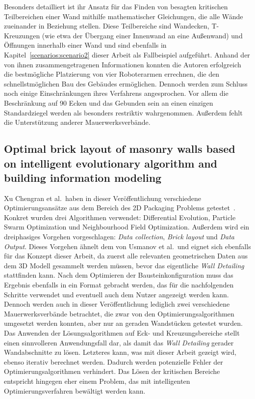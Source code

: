 Besonders detailliert ist ihr Ansatz für das Finden von besagten kritischen Teilbereichen einer Wand mithilfe mathematischer Gleichungen, die alle Wände zueinander in Beziehung stellen.
Diese Teilbereiche sind Wandecken, T-Kreuzungen (wie etwa der Übergang einer Innenwand an eine Außenwand) und Öffnungen innerhalb einer Wand und sind ebenfalls in Kapitel~\ref{scenarios:scenario2} dieser Arbeit als Fallbeispiel aufgeführt.
Anhand der von ihnen zusammengetragenen Informationen konnten die Autoren erfolgreich die bestmögliche Platzierung von vier Roboterarmen errechnen, die den schnellstmöglichen Bau des Gebäudes ermöglichen.
Dennoch werden zum Schluss noch einige Einschränkungen ihres Verfahrens angesprochen.
Vor allem die Beschränkung auf 90\textdegree{} Ecken und das Gebunden sein an einen einzigen Standardziegel werden als besonders restriktiv wahrgenommen.
Außerdem fehlt die Unterstützung anderer Mauerwerksverbände.

\subsection{Optimal brick layout of masonry walls based on intelligent evolutionary algorithm and building information modeling}
Xu Chengran et al.\ haben in dieser Veröffentlichung verschiedene Optimierungsansätze aus dem Bereich des 2D Packaging Problems getestet~\cite{Xu2021}.
Konkret wurden drei Algorithmen verwendet: Differential Evolution, Particle Swarm Optimization und Neighbourhood Field Optimization.
Außerdem wird ein dreiphasiges Vorgehen vorgeschlagen: \textit{Data collection}, \textit{Brick layout} und \textit{Data Output}.
Dieses Vorgehen ähnelt dem von Usmanov et al.\ und eignet sich ebenfalls für das Konzept dieser Arbeit, da zuerst alle relevanten geometrischen Daten aus dem 3D Modell gesammelt werden müssen, bevor das eigentliche \textit{Wall Detailing} stattfinden kann.
Nach dem Optimieren der Bausteinkonfiguration muss das Ergebnis ebenfalls in ein Format gebracht werden, das für die nachfolgenden Schritte verwendet und eventuell auch dem Nutzer angezeigt werden kann.
Dennoch werden auch in dieser Veröffentlichung lediglich zwei verschiedene Mauerwerksverbände betrachtet, die zwar von den Optimierungsalgorithmen umgesetzt werden konnten, aber nur an geraden Wandstücken getestet wurden.
Das Anwenden der Lösungsalgorithmen auf Eck- und Kreuzungsbereiche stellt einen sinnvolleren Anwendungsfall dar, als damit das \textit{Wall Detailing} gerader Wandabschnitte zu lösen.
Letzteres kann, was mit dieser Arbeit gezeigt wird, ebenso iterativ berechnet werden.
Dadurch werden potenzielle Fehler der Optimierungsalgorithmen verhindert.
Das Lösen der kritischen Bereiche entspricht hingegen eher einem Problem, das mit \glqq{}intelligenten\grqq{} Optimierungsverfahren bewältigt werden kann. 

